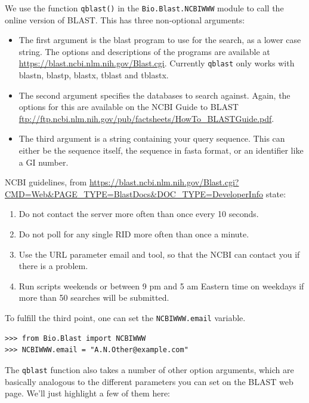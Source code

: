 We use the function \verb|qblast()| in the \verb|Bio.Blast.NCBIWWW| module
to call the online version of BLAST.  This has three non-optional arguments:
\begin{itemize}
\item The first argument is the blast program to use for the search, as a
lower case string. The options and descriptions of the programs are
available at \url{https://blast.ncbi.nlm.nih.gov/Blast.cgi}.
Currently \verb|qblast| only works with blastn, blastp, blastx, tblast
and tblastx.
\item The second argument specifies the databases to search against. Again,
the options for this are available on the NCBI Guide to BLAST
\url{ftp://ftp.ncbi.nlm.nih.gov/pub/factsheets/HowTo_BLASTGuide.pdf}.
\item The third argument is a string containing your query sequence.  This
can either be the sequence itself, the sequence in fasta format,
or an identifier like a GI number.
\end{itemize}

NCBI guidelines, from \url{https://blast.ncbi.nlm.nih.gov/Blast.cgi?CMD=Web&PAGE_TYPE=BlastDocs&DOC_TYPE=DeveloperInfo} state:
\begin{enumerate}
\item Do not contact the server more often than once every 10 seconds.
\item Do not poll for any single RID more often than once a minute.
\item Use the URL parameter email and tool, so that the NCBI can contact you if there is a problem.
\item Run scripts weekends or between 9 pm and 5 am Eastern time on weekdays if more than 50 searches will be submitted.
\end{enumerate}

To fulfill the third point, one can set the \verb|NCBIWWW.email| variable.
\begin{verbatim}
>>> from Bio.Blast import NCBIWWW
>>> NCBIWWW.email = "A.N.Other@example.com"
\end{verbatim}

The \verb|qblast| function also takes a number of other option arguments,
which are basically analogous to the different parameters you can set
on the BLAST web page.  We'll just highlight a few of them here:

